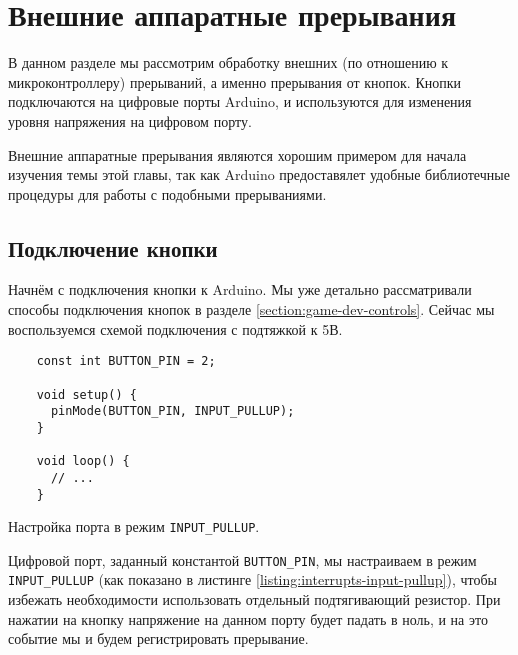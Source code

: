 \documentclass[../sparc.tex]{subfiles}
\begin{document}
\section{Внешние аппаратные прерывания}

В данном разделе мы рассмотрим обработку внешних (по отношению к
микроконтроллеру) прерываний, а именно прерывания от кнопок.  Кнопки
подключаются на цифровые порты Arduino, и используются для изменения уровня
напряжения на цифровом порту.

Внешние аппаратные прерывания являются хорошим примером для начала изучения темы
этой главы, так как Arduino предоставялет удобные библиотечные процедуры для
работы с подобными прерываниями.

\subsection{Подключение кнопки}
\label{section:interrupts-button}

Начнём с подключения кнопки к Arduino.  Мы уже детально рассматривали способы
подключения кнопок в разделе \ref{section:game-dev-controls}.  Сейчас мы
воспользуемся схемой подключения с подтяжкой к 5В.


\begin{listing}[H]
  \begin{verbatim}
    const int BUTTON_PIN = 2;

    void setup() {
      pinMode(BUTTON_PIN, INPUT_PULLUP);
    }

    void loop() {
      // ...
    }
  \end{verbatim}
  \caption{Настройка порта в режим \texttt{INPUT\_PULLUP}.}
  \label{listing:interrupts-input-pullup}
\end{listing}

Цифровой порт, заданный константой \texttt{BUTTON\_PIN}, мы настраиваем в режим
\texttt{INPUT\_PULLUP} (как показано в листинге
\ref{listing:interrupts-input-pullup}), чтобы избежать необходимости
использовать отдельный подтягивающий резистор.  При нажатии на кнопку напряжение
на данном порту будет падать в ноль, и на это событие мы и будем регистрировать
прерывание.

\end{document}

